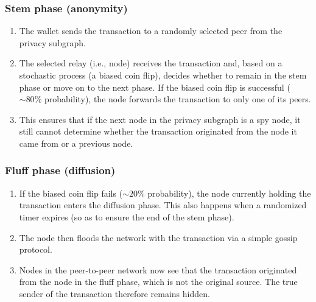 \documentclass[conference]{IEEEtran}
\begin{document}
\subsubsection{Stem phase (anonymity)}
\begin{enumerate}[label=(\alph*)]
\item The wallet sends the transaction to a randomly selected peer from the privacy subgraph.
\item The selected relay (i.e., node) receives the transaction and, based on a stochastic process (a biased coin flip), decides whether to remain in the stem phase or move on to the next phase. If the biased coin flip is successful ($\sim80\%$ probability), the node forwards the transaction to only one of its peers.
\item This ensures that if the next node in the privacy subgraph is a spy node, it still cannot determine whether the transaction originated from the node it came from or a previous node.
\end{enumerate}
\medskip
\subsubsection{Fluff phase (diffusion)}
\begin{enumerate}[label=(\alph*)]
\item If the biased coin flip fails ($\sim20\%$ probability), the node currently holding the transaction enters the diffusion phase. This also happens when a randomized timer expires (so as to ensure the end of the stem phase).
\item The node then floods the network with the transaction via a simple gossip protocol.
\item Nodes in the peer-to-peer network now see that the transaction originated from the node in the fluff phase, which is not the original source. The true sender of the transaction therefore remains hidden.
\end{enumerate}
\medskip
\end{document}
